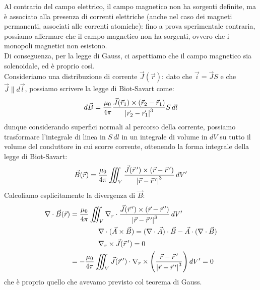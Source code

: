 Al contrario del campo elettrico, il campo magnetico non ha sorgenti definite, ma è associato alla presenza di correnti elettriche (anche nel caso dei magneti permanenti, associati alle correnti atomiche): fino a prova sperimentale contraria, possiamo affermare che il campo magnetico non ha sorgenti, ovvero che i monopoli magnetici non esistono. \\ 
%
Di conseguenza, per la legge di Gauss, ci aspettiamo che il campo magnetico sia solenoidale, ed è proprio così. \\ 
%
Consideriamo una distribuzione di corrente $ \vec{J}(\vec{r}) $: dato che $ \vec{i} = \vec{J} S $ e che $ \vec{J} \parallel d\vec{l} $, possiamo scrivere la legge di Biot-Savart come:
\begin{equation}
	d\vec{B} = \displaystyle\frac{\mu_0}{4\pi} \displaystyle\frac{\vec{J}(\vec{r}_1) \times (\vec{r}_2 - \vec{r}_1)}{\left\lvert\vec{r}_2 - \vec{r}_1\right\rvert^3} S \, dl 
	\label{eq:bio-savart-2}
\end{equation}
dunque considerando superfici normali al percorso della corrente, possiamo trasformare l'integrale di linea in $ S\,dl $ in un integrale di volume in $ dV $ su tutto il volume del conduttore in cui scorre corrente, ottenendo la forma integrale della legge di Biot-Savart:
\begin{equation}
	\vec{B}(\vec{r}) = \displaystyle\frac{\mu_0}{4\pi} \iiint_V \displaystyle\frac{\vec{J}(\vec{r}\,') \times (\vec{r} - \vec{r}\,')}{\left\lvert\vec{r} - \vec{r}\,'\right\rvert^3} \, dV'
	\label{eq:bio-savart-int}
\end{equation}
Calcoliamo esplicitamente la divergenza di $ \vec{B} $:
\begin{equation}
	\begin{split}
		\nabla\cdot\vec{B}(\vec{r}) &= \displaystyle\frac{\mu_0}{4\pi} \iiint_V \nabla_r \cdot \displaystyle\frac{\vec{J}(\vec{r}\,') \times (\vec{r} - \vec{r}\,')}{\left\lvert\vec{r} - \vec{r}\,'\right\rvert^3} \, dV' \\ 
				      & \qquad\qquad \nabla\cdot (\vec{A}\times\vec{B}) = (\nabla\cdot\vec{A})\cdot\vec{B} - \vec{A}\cdot (\nabla\cdot\vec{B}) \\ 
				      & \qquad\qquad \nabla_r \times\vec{J}(\vec{r}\,') = 0 \\ 
				      &= -\displaystyle\frac{\mu_0}{4\pi} \iiint_V \vec{J}(\vec{r}\,') \cdot \nabla_r \times \left(\displaystyle\frac{\vec{r} - \vec{r}\,'}{\left\lvert\vec{r} - \vec{r}\,'\right\rvert^3}\right) dV' = 0
	\end{split}
	\label{eq:}
\end{equation}
che è proprio quello che avevamo previsto col teorema di Gauss.

